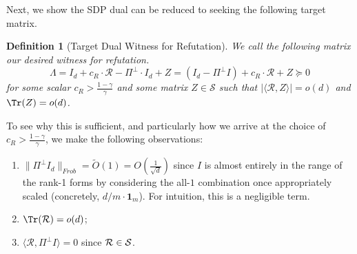 \documentclass[12pt]{article}
\newcommand{\Var}{\mathrm{Var}}
\def\1{\bm{1}}
\newtheorem{definition}[theorem]{Definition}
\newcommand{\calR}{\mathcal{R}}
\newcommand{\calS}{\mathcal{S}}
\newcommand{\gam}{\gamma}
\newcommand{\Authornote}[3]{{\sf\footnotesize\color{#3}{[#1: #2]}}}
\newcommand{\Authornote}[3]{}
\newcommand{\jnote}[1]{\Authornote{Jeff}{#1}{blue}}
\begin{document}
Next, we show the SDP dual can be reduced to seeking the following target matrix.
\begin{definition}[Target Dual Witness for Refutation] \label{def: target-refutation-witness}
	We call the following matrix our desired witness for refutation.
	 \[ 
 \Lambda = I_d+ c_R \cdot \calR - \Pi^\perp \cdot I_d  + Z = (I_d-   \Pi^\perp I)+ c_R \cdot \calR + Z  \succeq 0
 \] 
for some scalar $c_R > \frac{1-\gamma}{\gamma}$ and some matrix $Z \in \calS$ such that \( |\langle \calR, Z \rangle |= o(d)\) and $\Tr(Z) = o(d) $.
\end{definition}


To see why this is sufficient, and particularly how we arrive at the choice of $c_R >\frac{1-\gamma}{\gamma}$, we make the following observations:\begin{enumerate} 
	\item \jnote{check what condition on $\Pi^\perp I_d$ is most convenient} $\|\Pi^{\perp} I_d \|_{Frob} = \tilde{O}(1) = O(\frac{1}{\sqrt{d}}) $  since $I$ is almost entirely in the range of the rank-1 forms by considering the all-$1$ combination once appropriately scaled (concretely, $ d/m \cdot \1_m$). For intuition, this is a negligible term.
	\item $\Tr(\calR) = o(d)$;
 	\item  $\langle \calR, \Pi^\perp I \rangle = 0   $ since $\calR\in \cal S$.\end{enumerate}
% 
\end{document}
